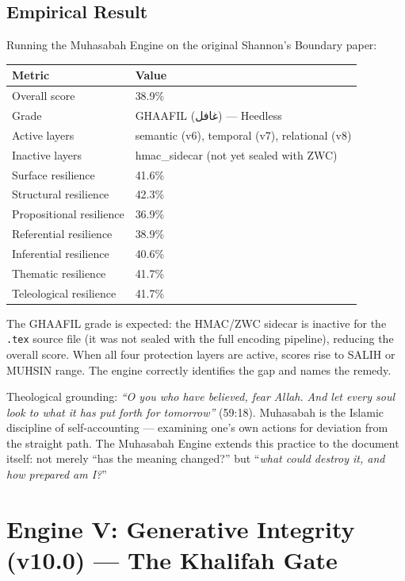 \documentclass[11pt,a4paper]{article}
\begin{document}
\subsection{Empirical Result}

Running the Muhasabah Engine on the original Shannon's Boundary paper:

\begin{center}
\begin{tabular}{ll}
\toprule
\textbf{Metric} & \textbf{Value} \\
\midrule
Overall score & 38.9\% \\
Grade & GHAAFIL (غافل) --- Heedless \\
Active layers & semantic (v6), temporal (v7), relational (v8) \\
Inactive layers & hmac\_sidecar (not yet sealed with ZWC) \\
Surface resilience & 41.6\% \\
Structural resilience & 42.3\% \\
Propositional resilience & 36.9\% \\
Referential resilience & 38.9\% \\
Inferential resilience & 40.6\% \\
Thematic resilience & 41.7\% \\
Teleological resilience & 41.7\% \\
\bottomrule
\end{tabular}
\end{center}

The GHAAFIL grade is expected: the HMAC/ZWC sidecar is inactive for the \texttt{.tex} source file (it was not sealed with the full encoding pipeline), reducing the overall score. When all four protection layers are active, scores rise to SALIH or MUHSIN range. The engine correctly identifies the gap and names the remedy.

Theological grounding: \textit{``O you who have believed, fear Allah. And let every soul look to what it has put forth for tomorrow''} (59:18). Muhasabah is the Islamic discipline of self-accounting --- examining one's own actions for deviation from the straight path. The Muhasabah Engine extends this practice to the document itself: not merely ``has the meaning changed?'' but ``\textit{what could destroy it, and how prepared am I?}''


\section{Engine V: Generative Integrity (v10.0) --- The Khalifah Gate}
\end{document}
